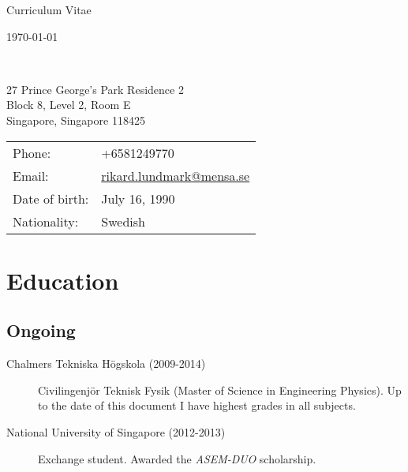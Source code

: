 


\panicmargindecrement{-0.9cm}{0.5cm}
\addtolength{\textheight}{1.5cm}







\vspace*{-0.7in}
\begin{minipage}{0.45\linewidth}
{\Huge Curriculum Vitae }
\end{minipage}
\begin{minipage}{0.45\linewidth}
{\hfill \small \ddmmyyyydate \today}
\end{minipage}
\vspace*{0.12in}
{\tiny }\\
{\huge \name}


\vspace{0.1in}
\begin{minipage}{0.45\linewidth}
  27 Prince George's Park Residence 2\\
  Block 8, Level 2, Room E \\
  Singapore, Singapore 118425 \\
    
\end{minipage}
\begin{minipage}{0.45\linewidth}
  \begin{tabular}{ll}
    Phone: & +6581249770\\
    Email: & \href{mailto:rikard.lundmark@mensa.se}{rikard.lundmark@mensa.se}\\
    Date of birth: & July 16, 1990 \\
    Nationality: & Swedish
  \end{tabular}
\end{minipage}

\section*{Education}

\subsection*{Ongoing}
\begin{description}
\item[Chalmers Tekniska Högskola (2009-2014)] Civilingenjör Teknisk Fysik (Master of Science in Engineering Physics). Up to the date of this document I have highest grades in all subjects.
\item[National University of Singapore (2012-2013)] Exchange student. Awarded the \emph{ASEM-DUO} scholarship.
\end{description}

